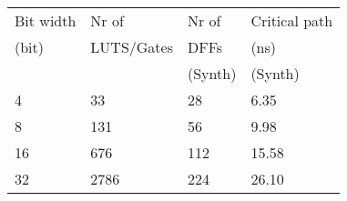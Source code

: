 \begin{tabular}{llll}
\hline
\hline
 {Bit width} & {Nr of}      & {Nr of}   & {Critical path} \\
 {(bit)}     & {LUTS/Gates} & {DFFs}    & {(ns)}          \\
             &              & {(Synth)} & {(Synth)}       \\
 4           & 33           & 28        & 6.35            \\
 8           & 131          & 56        & 9.98            \\
 16          & 676          & 112       & 15.58           \\
 32          & 2786         & 224       & 26.10           \\
\hline
\end{tabular}
